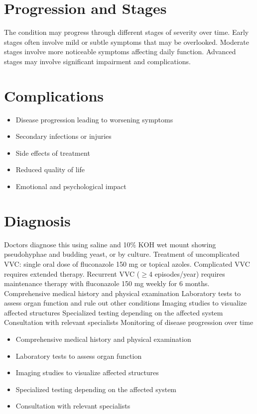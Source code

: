 \section{Progression and Stages}
The condition may progress through different stages of severity over time. Early stages often involve mild or subtle symptoms that may be overlooked. Moderate stages involve more noticeable symptoms affecting daily function. Advanced stages may involve significant impairment and complications.
\section{Complications}
\begin{itemize}[noitemsep]
  \item Disease progression leading to worsening symptoms
  \item Secondary infections or injuries
  \item Side effects of treatment
  \item Reduced quality of life
  \item Emotional and psychological impact
\end{itemize}
\section{Diagnosis}
Doctors diagnose this using saline and 10\% KOH wet mount showing pseudohyphae and budding yeast, or by culture. Treatment of uncomplicated VVC: single oral dose of fluconazole 150 mg or topical azoles. Complicated VVC requires extended therapy. Recurrent VVC ($\ge$4 episodes/year) requires maintenance therapy with fluconazole 150 mg weekly for 6 months. Comprehensive medical history and physical examination Laboratory tests to assess organ function and rule out other conditions Imaging studies to visualize affected structures Specialized testing depending on the affected system Consultation with relevant specialists Monitoring of disease progression over time

\begin{itemize}[noitemsep]
  \item Comprehensive medical history and physical examination
  \item Laboratory tests to assess organ function
  \item Imaging studies to visualize affected structures
  \item Specialized testing depending on the affected system
  \item Consultation with relevant specialists
\end{itemize}
